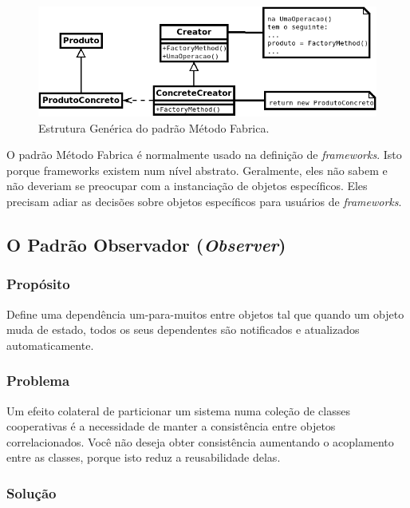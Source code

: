 \begin{figure}[h]
\begin{center}
\includegraphics[scale=0.6]{dp_factoryMethod.png}
\caption{Estrutura Genérica do padrão Método Fabrica.}\label{fig:factMeth}
\end{center}
\end{figure}

O padrão Método Fabrica é normalmente usado na definição de \textit{frameworks}. Isto porque frameworks existem num nível abstrato. Geralmente, eles não sabem e não deveriam se preocupar  com a instanciação de objetos específicos. Eles precisam adiar as decisões sobre objetos específicos para usuários de \textit{frameworks}.

\subsection{O Padrão Observador (\textit{Observer})}

\subsubsection{Propósito}

Define uma dependência um-para-muitos entre objetos tal que quando um objeto muda de estado, todos os seus dependentes são notificados e atualizados automaticamente.

\subsubsection{Problema}

Um efeito colateral de particionar um sistema numa coleção de classes cooperativas é a necessidade de manter a consistência entre objetos correlacionados. Você não deseja obter consistência aumentando o acoplamento entre as classes, porque isto reduz a reusabilidade delas.

\subsubsection{Solução}

